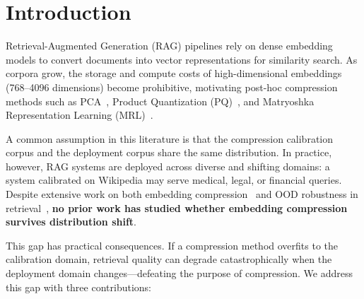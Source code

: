 \documentclass[sigconf]{acmart}
\begin{document}


\maketitle


\section{Introduction}\label{sec:intro}

Retrieval-Augmented Generation (RAG) pipelines rely on dense embedding models to convert documents into vector representations for similarity search. As corpora grow, the storage and compute costs of high-dimensional embeddings (768--4096 dimensions) become prohibitive, motivating post-hoc compression methods such as PCA~\cite{huerga2025rag}, Product Quantization (PQ)~\cite{johnson2019faiss}, and Matryoshka Representation Learning (MRL)~\cite{kusupati2022matryoshka}.

A common assumption in this literature is that the compression calibration corpus and the deployment corpus share the same distribution. In practice, however, RAG systems are deployed across diverse and shifting domains: a system calibrated on Wikipedia may serve medical, legal, or financial queries. Despite extensive work on both embedding compression~\cite{huerga2025rag, kusupati2022matryoshka, zhang2025smec, zhao2026dive} and OOD robustness in retrieval~\cite{bao2025ood, liu2025robust}, \textbf{no prior work has studied whether embedding compression survives distribution shift}.

This gap has practical consequences. If a compression method overfits to the calibration domain, retrieval quality can degrade catastrophically when the deployment domain changes---defeating the purpose of compression. We address this gap with three contributions:
\end{document}
